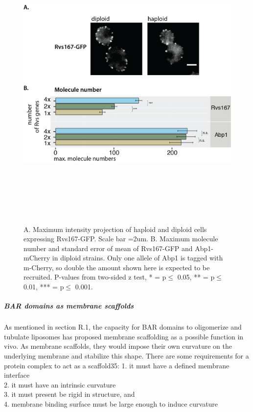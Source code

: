 						\begin{figure}[H]
	\centering
	\includegraphics[width=15cm,height=15cm,keepaspectratio]{figures/results_final/protein_frictionB}
	\vspace*{2mm}
	\caption[Molecule numbers in diploid cells]
	{A. Maximum intensity projection of haploid and diploid cells expressing Rvs167-GFP. Scale bar =2um.      
	B. Maximum molecule number and standard error of mean of Rvs167-GFP and Abp1-mCherry in diploid strains. Only one allele of Abp1 is tagged with m-Cherry, so double the amount shown here is expected to be recruited. P-values from two-sided z test,  * = p$\leq$ 0.05, ** = p$\leq$ 0.01, *** = p$\leq$ 0.001. 
		\label{fig_rvsdiploid}}
\end{figure}



\newpage
	\subparagraph{BAR domains as membrane scaffolds}
	As mentioned in section R.1, the capacity for BAR domains to oligomerize and tubulate liposomes has proposed membrane scaffolding as a possible function in vivo. As membrane scaffolds, they would impose their own curvature on the underlying membrane and stabilize this shape. There are some requirements for a protein complex to act as a scaffold35:
	1. it must have a defined membrane interface\\
	2. it must have an intrinsic curvature\\
	3. it must present be rigid in structure, and\\
	4. membrane binding surface must be large enough to induce curvature\\

